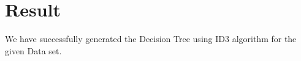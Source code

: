 \documentclass[a4paper]{article}
\begin{document}
							            		\newpage
	\section{Result}
	We have successfully generated the Decision Tree using ID3 algorithm for the given Data set.
\end{document}
